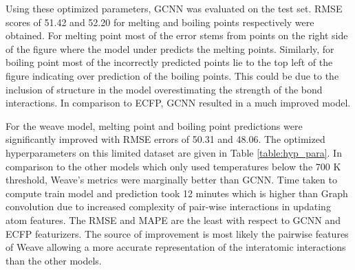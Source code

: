\documentclass[book.tex]{subfiles}
\begin{document}


Using these optimized parameters, GCNN was evaluated on the test set. RMSE scores of 51.42 and 52.20 for melting and boiling points respectively were obtained. For melting point most of the error stems from points on the right side of the figure where the model under predicts the melting points. Similarly, for boiling point most of the incorrectly predicted points lie to the top left of the figure indicating over prediction of the boiling points. This could be due to the inclusion of structure in the model overestimating the strength of the bond interactions. In comparison to ECFP, GCNN resulted in a much improved model.




For the weave model, melting point and boiling point predictions were significantly improved with RMSE errors of 50.31 and 48.06. The optimized hyperparameters on this limited dataset are given in Table \ref{table:hyp_para}. In comparison to the other models which only used temperatures below the 700 K threshold, Weave's metrics were marginally better than GCNN. Time taken to compute train model and prediction took 12 minutes which is higher than Graph convolution due to increased complexity of pair-wise interactions in updating atom features. The RMSE and MAPE are the least with respect to GCNN and ECFP featurizers. The source of improvement is most likely the pairwise features of Weave allowing a more accurate representation of the interatomic interactions than the other models.

\end{document}
